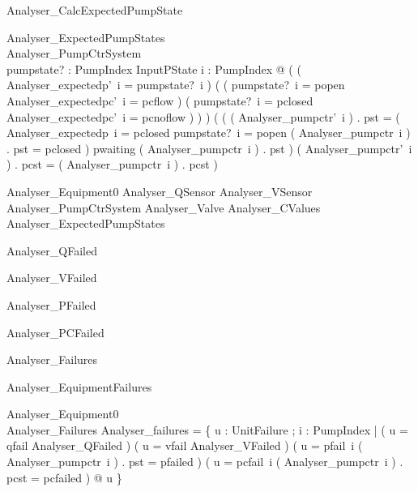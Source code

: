 \documentclass{article}
\begin{document}
\begin{schema}{Analyser\_CalcExpectedPumpState}

 \Delta Analyser\_ExpectedPumpStates \\
 \Delta Analyser\_PumpCtrSystem \\
 pumpstate? : PumpIndex \fun InputPState 
\where
 \forall i : PumpIndex @ ( ( Analyser\_expectedp'~i = pumpstate?~i ) \land ( ( pumpstate?~i = popen \land Analyser\_expectedpc'~i = pcflow ) \lor ( pumpstate?~i = pclosed \land Analyser\_expectedpc'~i = pcnoflow ) ) ) \land ( ( ( Analyser\_pumpctr'~i ) . pst = \IF ( Analyser\_expectedp~i = pclosed \land pumpstate?~i = popen \land ( Analyser\_pumpctr~i ) . pst = pclosed ) \THEN pwaiting \ELSE ( Analyser\_pumpctr~i ) . pst ) \land ( Analyser\_pumpctr'~i ) . pcst = ( Analyser\_pumpctr~i ) . pcst )
\end{schema}

\begin{zed}
	Analyser\_Equipment0  Analyser\_QSensor \land Analyser\_VSensor \land Analyser\_PumpCtrSystem \land Analyser\_Valve \land Analyser\_CValues \land Analyser\_ExpectedPumpStates
\end{zed}

\begin{zed}
	Analyser\_QFailed 
\end{zed}

\begin{zed}
	Analyser\_VFailed 
\end{zed}

\begin{zed}
	Analyser\_PFailed 
\end{zed}

\begin{zed}
	Analyser\_PCFailed 
\end{zed}

\begin{zed}
	Analyser\_Failures 
\end{zed}

\begin{schema}{Analyser\_EquipmentFailures}

 Analyser\_Equipment0 \\
 Analyser\_Failures 
\where
 Analyser\_failures = \{ u : UnitFailure ; i : PumpIndex | ( u = qfail \land Analyser\_QFailed ) \lor ( u = vfail \land Analyser\_VFailed ) \lor ( u = pfail~i \land ( Analyser\_pumpctr~i ) . pst = pfailed ) \lor ( u = pcfail~i \land ( Analyser\_pumpctr~i ) . pcst = pcfailed ) @ u \}
\end{schema}
\end{document}
